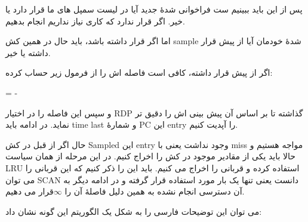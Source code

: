 \documentclass[17pt]{article}
\begin{document}
پس از این باید ببینیم ست فراخوانی شدهٔ جدید آیا در لیست سمپل های ما قرار دارد یا خیر. اگر قرار ندارد که کاری نیاز نداریم انجام بدهیم.

اما اگر قرار داشته باشد، باید حال در همین کش sample شدهٔ خودمان آیا از پیش قرار داشته یا خیر.

اگر از پیش قرار داشته، کافی است فاصله اش را از فرمول زیر حساب کرده:

\begin{center}
\begin{latin}
 =  - 	
\end{latin}
\end{center}

و سپس این فاصله را در اختیار RDP گذاشته تا بر اساس آن پیش بینی اش را دقیق تر نماید. در ادامه باید time last و شمارهٔ PC این entry را آپدیت کنیم.

حال اگر از قبل در کش Sampled این entry وجود نداشت یعنی با miss مواجه هستیم و حالا باید یکی از مقادیر موجود در کش را اخراج کنیم. در این مرحله از همان سیاست LRU استفاده کرده و قربانی را اخراج می کنیم. باید این را ذکر کنیم که این قربانی را می توان SCAN دانست یعنی تنها یک بار مورد استفاده قرار گرفته و در ادامه دیگر به آن دسترسی انجام نشده به همین دلیل فاصلهٔ آن را $\infty $قرار می دهیم.

می توان این توضیحات فارسی را به شکل یک الگوریتم این گونه نشان داد:
\end{document}
